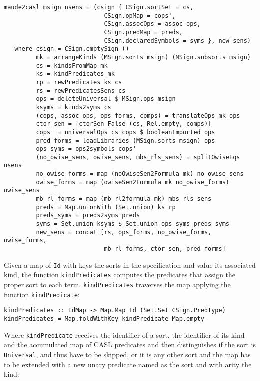 {\codesize
\begin{verbatim}
maude2casl msign nsens = (csign { CSign.sortSet = cs,
                            CSign.opMap = cops',
                            CSign.assocOps = assoc_ops,
                            CSign.predMap = preds,
                            CSign.declaredSymbols = syms }, new_sens)
   where csign = CSign.emptySign ()
         mk = arrangeKinds (MSign.sorts msign) (MSign.subsorts msign)
         cs = kindsFromMap mk
         ks = kindPredicates mk
         rp = rewPredicates ks cs
         rs = rewPredicatesSens cs
         ops = deleteUniversal $ MSign.ops msign
         ksyms = kinds2syms cs
         (cops, assoc_ops, ops_forms, comps) = translateOps mk ops
         ctor_sen = [ctorSen False (cs, Rel.empty, comps)]
         cops' = universalOps cs cops $ booleanImported ops
         pred_forms = loadLibraries (MSign.sorts msign) ops
         ops_syms = ops2symbols cops'
         (no_owise_sens, owise_sens, mbs_rls_sens) = splitOwiseEqs nsens
         no_owise_forms = map (noOwiseSen2Formula mk) no_owise_sens
         owise_forms = map (owiseSen2Formula mk no_owise_forms) owise_sens
         mb_rl_forms = map (mb_rl2formula mk) mbs_rls_sens
         preds = Map.unionWith (Set.union) ks rp
         preds_syms = preds2syms preds
         syms = Set.union ksyms $ Set.union ops_syms preds_syms
         new_sens = concat [rs, ops_forms, no_owise_forms, owise_forms,
                            mb_rl_forms, ctor_sen, pred_forms]
\end{verbatim}
}

Given a map of \verb"Id" with keys the sorts in the specification and
value its associated kind, the function \verb"kindPredicates" computes
the predicates that assign the proper sort to each term.
\verb"kindPredicates" traverses the map applying the function
\verb"kindPredicate":

{\codesize
\begin{verbatim}
kindPredicates :: IdMap -> Map.Map Id (Set.Set CSign.PredType)
kindPredicates = Map.foldWithKey kindPredicate Map.empty
\end{verbatim}
}

\noindent Where \verb"kindPredicate" receives the identifier of a sort,
the identifier of its kind and the accumulated map of CASL predicates
and then distinguishes if the sort is \verb"Universal", and thus have to be
skipped, or it is any other sort and the map has to be extended with a
new unary predicate named as the sort and with arity the kind:

